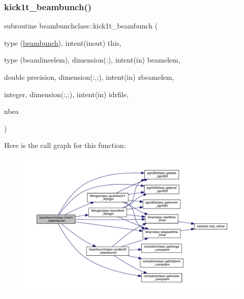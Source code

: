 \subsubsection{\texorpdfstring{kick1t\_beambunch()}{kick1t\_beambunch()}}
{\footnotesize\ttfamily subroutine beambunchclass\+::kick1t\+\_\+beambunch (\begin{DoxyParamCaption}\item[{type (\mbox{\hyperlink{namespacebeambunchclass_structbeambunchclass_1_1beambunch}{beambunch}}), intent(inout)}]{this,  }\item[{type (beamlineelem), dimension(\+:), intent(in)}]{beamelem,  }\item[{double precision, dimension(\+:,\+:), intent(in)}]{zbeamelem,  }\item[{integer, dimension(\+:,\+:), intent(in)}]{idrfile,  }\item[{}]{nbea }\end{DoxyParamCaption})}

Here is the call graph for this function\+:
\nopagebreak
\begin{figure}[H]
\begin{center}
\leavevmode
\includegraphics[width=350pt]{namespacebeambunchclass_ac4e7c6a08c052c9bbc3c2bb1703adea6_cgraph}
\end{center}
\end{figure}
\mbox{\label{namespacebeambunchclass_a13904891d2d14b332c4178871e861363}} 
